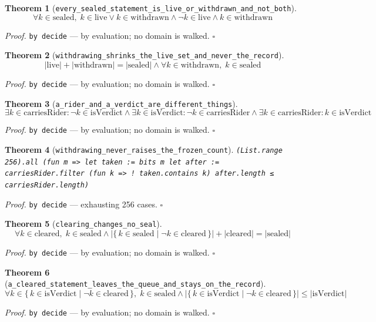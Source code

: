 \documentclass[11pt]{article}
\newtheorem{theorem}{Theorem}[section]
\begin{document}
\begin{theorem}[\texttt{every\_sealed\_statement\_is\_live\_or\_withdrawn\_and\_not\_both}]
\[ \forall k \in \mathrm{sealed},\; k \in \mathrm{live} \lor k \in \mathrm{withdrawn} \land \lnot k \in \mathrm{live} \land k \in \mathrm{withdrawn} \]
\end{theorem}
\noindent\emph{Proof.} \texttt{by decide} --- by evaluation; no domain is walked. \hfill$\square$

\begin{theorem}[\texttt{withdrawing\_shrinks\_the\_live\_set\_and\_never\_the\_record}]
\[ \left|\mathrm{live}\right| + \left|\mathrm{withdrawn}\right| = \left|\mathrm{sealed}\right| \land \forall k \in \mathrm{withdrawn},\; k \in \mathrm{sealed} \]
\end{theorem}
\noindent\emph{Proof.} \texttt{by decide} --- by evaluation; no domain is walked. \hfill$\square$

\begin{theorem}[\texttt{a\_rider\_and\_a\_verdict\_are\_different\_things}]
\[ \exists k \in \mathrm{carriesRider} : \lnot k \in \mathrm{isVerdict} \land \exists k \in \mathrm{isVerdict} : \lnot k \in \mathrm{carriesRider} \land \exists k \in \mathrm{carriesRider} : k \in \mathrm{isVerdict} \]
\end{theorem}
\noindent\emph{Proof.} \texttt{by decide} --- by evaluation; no domain is walked. \hfill$\square$

\begin{theorem}[\texttt{withdrawing\_never\_raises\_the\_frozen\_count}]
\texttt{(List.range 256).all (fun m => let taken := bits m let after := carriesRider.filter (fun k => ! taken.contains k) after.length ≤ carriesRider.length)}
\end{theorem}
\noindent\emph{Proof.} \texttt{by decide} --- exhausting 256 cases. \hfill$\square$

\begin{theorem}[\texttt{clearing\_changes\_no\_seal}]
\[ \forall k \in \mathrm{cleared},\; k \in \mathrm{sealed} \land \left|\{\, k \in \mathrm{sealed} \mid \lnot k \in \mathrm{cleared} \,\}\right| + \left|\mathrm{cleared}\right| = \left|\mathrm{sealed}\right| \]
\end{theorem}
\noindent\emph{Proof.} \texttt{by decide} --- by evaluation; no domain is walked. \hfill$\square$

\begin{theorem}[\texttt{a\_cleared\_statement\_leaves\_the\_queue\_and\_stays\_on\_the\_record}]
\[ \forall k \in \{\, k \in \mathrm{isVerdict} \mid \lnot k \in \mathrm{cleared} \,\},\; k \in \mathrm{sealed} \land \left|\{\, k \in \mathrm{isVerdict} \mid \lnot k \in \mathrm{cleared} \,\}\right| \le \left|\mathrm{isVerdict}\right| \]
\end{theorem}
\noindent\emph{Proof.} \texttt{by decide} --- by evaluation; no domain is walked. \hfill$\square$
\end{document}
